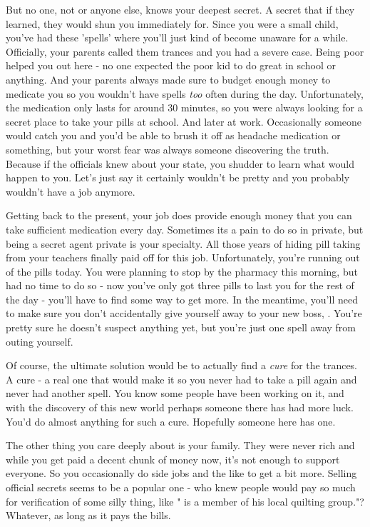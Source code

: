\documentclass[char]{guildcamp3}
\begin{document}
But no one, not \cPoliOne{} or anyone else, knows your deepest secret. A secret that if they learned, they would shun you immediately for. Since you were a small child, you've had these 'spells' where you'll just kind of become unaware for a while. Officially, your parents called them trances and you had a severe case. Being poor helped you out here - no one expected the poor kid to do great in school or anything. And your parents always made sure to budget enough money to medicate you so you wouldn't have spells \emph{too} often during the day. Unfortunately, the medication only lasts for around 30 minutes, so you were always looking for a secret place to take your pills at school. And later at work. Occasionally someone would catch you and you'd be able to brush it off as headache medication or something, but your worst fear was always someone discovering the truth. Because if the officials knew about your state, you shudder to learn what would happen to you. Let's just say it certainly wouldn't be pretty and you probably wouldn't have a job anymore.

Getting back to the present, your job does provide enough money that you can take sufficient medication every day. Sometimes its a pain to do so in private, but being a secret agent private is your specialty. All those years of hiding pill taking from your teachers finally paid off for this job. Unfortunately, you're running out of the pills today. You were planning to stop by the pharmacy this morning, but had no time to do so - now you've only got three pills to last you for the rest of the day - you'll have to find some way to get more. In the meantime, you'll need to make sure you don't accidentally give yourself away to your new boss, \cSpecOpOne{}. You're pretty sure he doesn't suspect anything yet, but you're just one spell away from outing yourself. 

Of course, the ultimate solution would be to actually find a \emph{cure} for the trances. A cure - a real one that would make it so you never had to take a pill again and never had another spell. You know some people have been working on it, and with the discovery of this new world perhaps someone there has had more luck. You'd do almost anything for such a cure. Hopefully someone here has one.  

The other thing you care deeply about is your family. They were never rich and while you get paid a decent chunk of money now, it's not enough to support everyone. So you occasionally do side jobs and the like to get a bit more. Selling official secrets seems to be a popular one - who knew people would pay so much for verification of some silly thing, like "\cPoliOne{} is a member of his local quilting group."? Whatever, as long as it pays the bills. 
\end{document}
